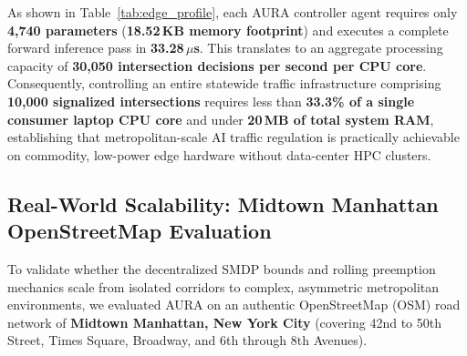 As shown in Table~\ref{tab:edge_profile}, each AURA controller agent requires only \textbf{4,740 parameters} (\textbf{18.52\,KB memory footprint}) and executes a complete forward inference pass in \textbf{33.28\,$\mu$s}. This translates to an aggregate processing capacity of \textbf{30,050 intersection decisions per second per CPU core}. Consequently, controlling an entire statewide traffic infrastructure comprising \textbf{10,000 signalized intersections} requires less than \textbf{33.3\% of a single consumer laptop CPU core} and under \textbf{20\,MB of total system RAM}, establishing that metropolitan-scale AI traffic regulation is practically achievable on commodity, low-power edge hardware without data-center HPC clusters.

\begin{table}[t]
\centering
\caption{Decentralized Edge Computational Footprint and Latency}
\label{tab:edge_profile}
\end{table}

\subsection{Real-World Scalability: Midtown Manhattan OpenStreetMap Evaluation}
To validate whether the decentralized SMDP bounds and rolling preemption mechanics scale from isolated corridors to complex, asymmetric metropolitan environments, we evaluated AURA on an authentic OpenStreetMap (OSM) road network of \textbf{Midtown Manhattan, New York City} (covering 42nd to 50th Street, Times Square, Broadway, and 6th through 8th Avenues).

